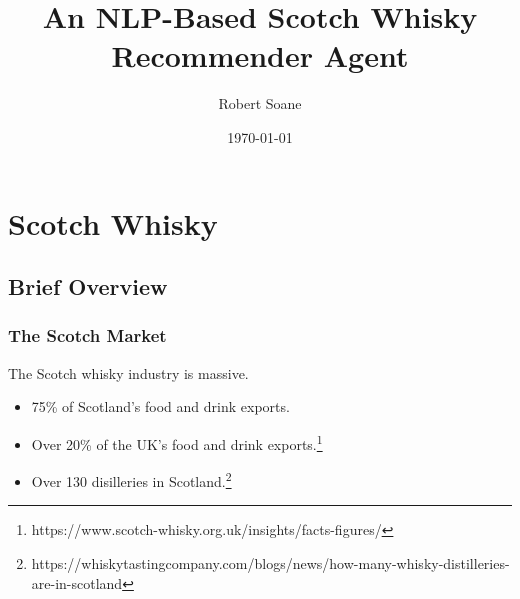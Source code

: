 \documentclass{beamer}
\title[Scotch Recommender]{An NLP-Based Scotch Whisky Recommender Agent} %
\author{Robert Soane} %
\institute[14302983] %
{
14302983 \\ %
\medskip
}
\date{\today} %
\begin{document}
\begin{frame}
\titlepage %
\end{frame}


\section{Scotch Whisky} 

\subsection{Brief Overview} %

\begin{frame}
\frametitle{The Scotch Market}
The Scotch whisky industry is massive.
\begin{itemize}
    \item 75\% of Scotland's food and drink exports.
    \item Over 20\% of the UK's food and drink exports.\footnote{https://www.scotch-whisky.org.uk/insights/facts-figures/}
    \item Over 130 disilleries in Scotland.\footnote{https://whiskytastingcompany.com/blogs/news/how-many-whisky-distilleries-are-in-scotland}
\end{itemize}

\end{frame}
\end{document}
